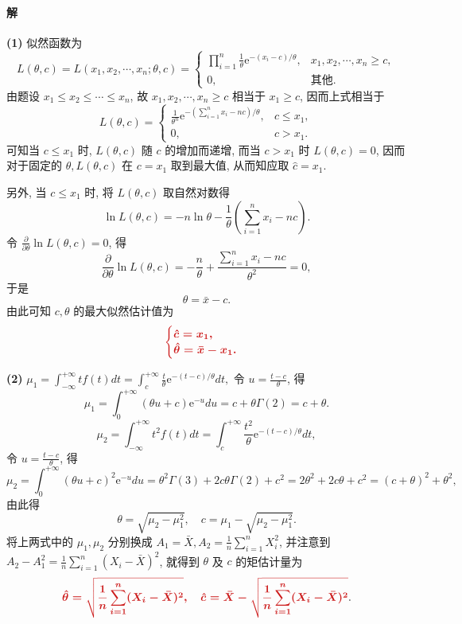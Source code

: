 \documentclass[11pt, UTF8]{ctexart}
\newcommand{\ans}[1]{{\color{fred}\boldsymbol{#1}}}
\begin{document}
\paragraph{\color{fblue}解}
\textbf{(1)} 似然函数为
\[ L(\theta, c) = L(x_1, x_2, \cdots, x_n; \theta, c)
= \begin{cases}
\prod_{i=1}^n \frac{1}{\theta} \mathrm{e}^{-(x_i-c)/\theta}, & x_1, x_2, \cdots, x_n \ge c, \\
0, & \text{其他}.
\end{cases} \]
由题设 \(x_1 \le x_2 \le \cdots \le x_n\), 故 \(x_1, x_2, \cdots, x_n \ge c\) 相当于 \(x_1 \ge c\), 因而上式相当于
\[ L(\theta, c) = \begin{cases}
\frac{1}{\theta^n} \mathrm{e}^{-\left(\sum_{i=1}^n x_i - nc\right)/\theta}, & c \le x_1, \\
0, & c > x_1.
\end{cases} \]
可知当 \(c \le x_1\) 时, \(L(\theta, c)\) 随 \(c\) 的增加而递增, 而当 \(c > x_1\) 时 \(L(\theta, c) = 0\), 因而对于固定的 \(\theta, L(\theta, c)\) 在 \(c = x_1\) 取到最大值, 从而知应取 \(\hat{c} = x_1\).

另外, 当 \(c \le x_1\) 时, 将 \(L(\theta, c)\) 取自然对数得
\[ \ln L(\theta, c) = -n\ln \theta - \frac{1}{\theta}\left(\sum_{i=1}^n x_i - nc\right). \]
令 \(\frac{\partial}{\partial \theta}\ln L(\theta, c) = 0\), 得
\[ \frac{\partial}{\partial \theta}\ln L(\theta, c) = -\frac{n}{\theta} + \frac{\sum_{i=1}^n x_i - nc}{\theta^2} = 0, \]
于是
\[ \theta = \bar{x} - c. \]
由此可知 \(c, \theta\) 的最大似然估计值为
\[ \ans{\begin{cases}
\hat{c} = x_1, \\
\hat{\theta} = \bar{x} - x_1.
\end{cases}} \]

\vspace{1em}
\textbf{(2)} \(\mu_1 = \int_{-\infty}^{+\infty} t f(t) dt = \int_c^{+\infty} \frac{t}{\theta} \mathrm{e}^{-(t-c)/\theta} dt,\)
令 \(u = \frac{t-c}{\theta}\), 得
\[ \mu_1 = \int_0^{+\infty} (\theta u + c) \mathrm{e}^{-u} du = c + \theta \Gamma(2) = c + \theta. \]
\[ \mu_2 = \int_{-\infty}^{+\infty} t^2 f(t) dt = \int_c^{+\infty} \frac{t^2}{\theta} \mathrm{e}^{-(t-c)/\theta} dt, \]
令 \(u = \frac{t-c}{\theta}\), 得
\[ \mu_2 = \int_0^{+\infty} (\theta u + c)^2 \mathrm{e}^{-u} du = \theta^2 \Gamma(3) + 2c\theta \Gamma(2) + c^2 = 2\theta^2 + 2c\theta + c^2 = (c+\theta)^2 + \theta^2, \]
由此得
\[ \theta = \sqrt{\mu_2 - \mu_1^2}, \quad c = \mu_1 - \sqrt{\mu_2 - \mu_1^2}. \]
将上两式中的 \(\mu_1, \mu_2\) 分别换成 \(A_1 = \bar{X}, A_2 = \frac{1}{n}\sum_{i=1}^n X_i^2\), 并注意到 \(A_2 - A_1^2 = \frac{1}{n}\sum_{i=1}^n (X_i - \bar{X})^2\), 就得到 \(\theta\) 及 \(c\) 的矩估计量为
\[ \ans{\hat{\theta} = \sqrt{\frac{1}{n}\sum_{i=1}^n (X_i - \bar{X})^2}, \quad \hat{c} = \bar{X} - \sqrt{\frac{1}{n}\sum_{i=1}^n (X_i - \bar{X})^2}}. \]
\end{document}
